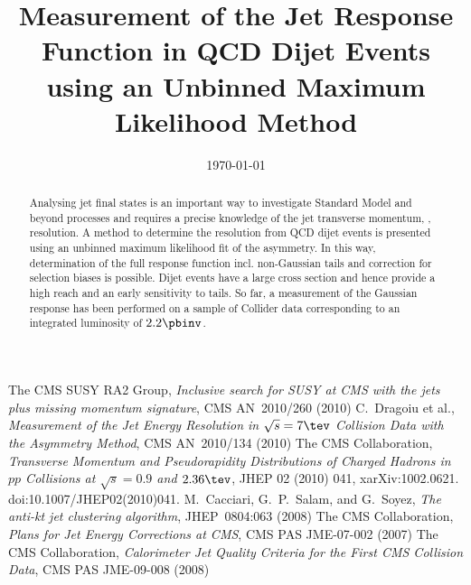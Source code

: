 \documentclass[a4paper]{cmspaper} %
\begin{document}
\begin{titlepage}
  \date{\today}
  \title{Measurement of the Jet \pt Response Function in QCD Dijet
    Events using an Unbinned Maximum Likelihood Method}
  \begin{abstract}
    Analysing jet final states is an important way to investigate
    Standard Model and beyond processes and requires a precise
    knowledge of the jet transverse momentum, \textit{\pt}, resolution.	
    A method to determine the resolution from QCD dijet
    events is presented using an unbinned maximum
    likelihood fit of the \pt asymmetry.
    In this way, determination of the full response function incl. non-Gaussian
    tails and correction for selection biases is possible.
    Dijet events have a large cross section and hence provide a
    high \pt reach and an early sensitivity to tails.
    So far, a measurement of the Gaussian response has been performed
    on a sample of Collider data corresponding to an integrated luminosity of $2.2\pbinv$.
	
  \end{abstract}
\end{titlepage}
\tableofcontents













\begin{thebibliography}{9}
 The CMS SUSY RA2 Group,
  \textit{Inclusive search for SUSY at CMS with the jets plus missing
    momentum signature},
  CMS AN~2010/260 (2010)
 C.~Dragoiu et al.,
  \textit{Measurement of the Jet Energy Resolution in $\sqrt{s}=7\tev$
    Collision Data with the Asymmetry Method},
  CMS AN~2010/134 (2010)
 The CMS Collaboration,
  \textit{Transverse Momentum and Pseudorapidity Distributions of
    Charged Hadrons in $pp$ Collisions at \mbox{$\sqrt{s} = 0.9$} and $2.36\tev$}, JHEP 02 (2010) 041,
 xarXiv:1002.0621. doi:10.1007/JHEP02(2010)041.
 M.~Cacciari, G.~P.~Salam, and G.~Soyez,
  \textit{The anti-kt jet clustering algorithm},
  JHEP~0804:063 (2008)
 The CMS Collaboration,
  \textit{Plans for Jet Energy Corrections at CMS},
  CMS PAS JME-07-002 (2007)
  The CMS Collaboration,
  \textit{Calorimeter Jet Quality Criteria for the First CMS Collision Data},
  CMS PAS JME-09-008 (2008)
\end{thebibliography}
\end{document}
